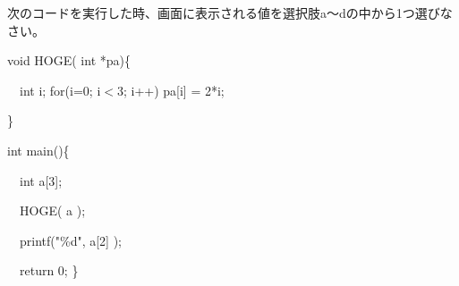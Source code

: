 次のコードを実行した時、画面に表示される値を選択肢a〜dの中から1つ選びなさい。\par
\noindent void HOGE( int *pa)\{ \par
\noindent 　int i; for(i=0; i$<$3; i++) pa[i] = 2*i; \par
\noindent \} \par
\noindent int main()\{ \par
\noindent 　int a[3]; \par
\noindent 　HOGE( a ); \par
\noindent 　printf("\%d", a[2] ); \par
\noindent 　return 0; \} \par
